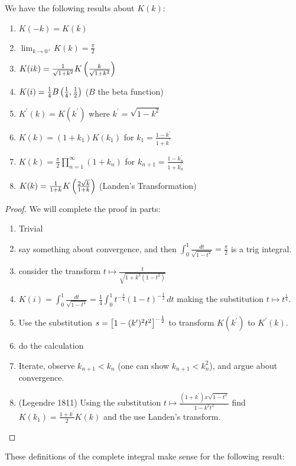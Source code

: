 \documentclass{article}
\begin{document}
\begin{prop}
	We have the following results about $K(k)$:
	\begin{enumerate}
		\item $K(-k) = K(k)$
		\item $\lim_{k \to 0^+} K(k) = \frac{\pi}{2}$
		\item $K(ik) = \frac{1}{\sqrt{1+k^2}}K\left( \frac{k}{\sqrt{1+k^2}} \right)$
		\item $K(i) = \frac{1}{4}B\left( \frac{1}{4},\frac{1}{2} \right)$ ($B$ the beta function)
		\item $K^\prime(k) = K(k^\prime)$ where $k^\prime = \sqrt{1-k^2}$
		\item $K(k) = (1+k_1) K(k_1)$ for $k_1 = \frac{1-k^\prime}{1+k^\prime}$
		\item $K(k) = \frac{\pi}{2} \prod_{n=1}^\infty (1+k_n)$ for $k_{n+1} = \frac{1-k_n^\prime}{1+k_n^\prime}$
		\item 	$K(k)  = \frac{1}{1+k} K \left( \frac{2\sqrt{k}}{1+k} \right)$ (Landen's Transformation)
	\end{enumerate}
\end{prop}
\begin{proof}
	We will complete the proof in parts:
\begin{enumerate}
	\item Trivial 
	\item say something about convergence, and then $\int_0^1 \frac{dt}{\sqrt{1-t^2}} = \frac{\pi}{2}$ is a trig integral. 
	\item  consider the transform $	t \mapsto \frac{t}{\sqrt{1+k^3(1-t^2)}}$
	\item $K(i) = \int_0^1 \frac{dt}{\sqrt{1-t^4}} = \frac{1}{4} \int_0^1 t^{-\frac{3}{4}}(1-t)^{-\frac{1}{2}} \, dt$ making the substitution $t\mapsto t^\frac{1}{4}$.
	\item Use the substitution $s = \left[ 1-(k^\prime)^2 t^2 \right]^{-\frac{1}{2}}$ to transform $K(k^\prime)$ to $K^\prime(k)$.
	\item do the calculation
	\item Iterate, observe $k_{n+1} < k_n$ (one can show $k_{n+1}<k_n^2$), and argue about convergence. 
	\item (Legendre 1811) Using the substitution $t \mapsto \frac{(1+k^\prime)x\sqrt{1-t^2}}{1-k^2 t^2}$ find $K(k_1) = \frac{1+k^\prime}{2}K(k)$ and the use Landen's transform.  
\end{enumerate}
\end{proof}


These definitions of the complete integral make sense for the following result:
\end{document}
